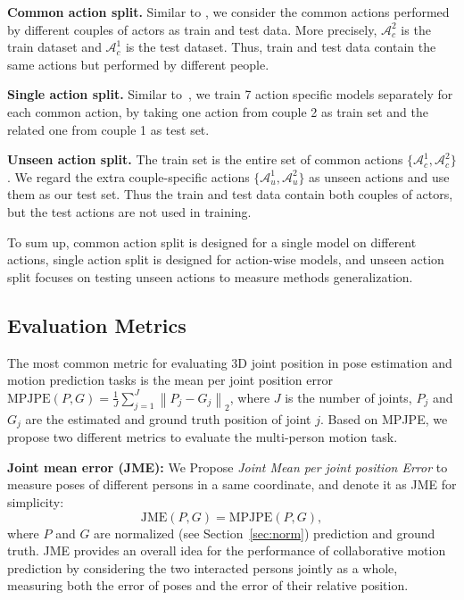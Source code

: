\vspace{0mm}
\noindent\textbf{Common action split.}
Similar to \cite{ionescu2013human3}, we consider the common actions performed by different couples of actors as train and test data. More precisely, $\mathcal{A}_{c}^{2}$ is the train dataset and $\mathcal{A}_{c}^{1}$ is the test dataset. Thus, train and test data contain the same actions but performed by different people. 

\vspace{0mm}
\noindent\textbf{Single action split.}
Similar to~\cite{fragkiadaki2015recurrent,jain2016structural}, we train 7 action specific models separately for each common action, by taking one action from couple 2 as train set and the related one from couple 1 as test set.

\vspace{0mm}
\noindent\textbf{Unseen action split.}
The train set is the entire set of common actions $\{\mathcal{A}_{c}^1, \mathcal{A}_{c}^2\}$. We regard the extra couple-specific actions $\{\mathcal{A}_{u}^{1}, \mathcal{A}_{u}^{2}\}$ as unseen actions and use them as our test set. Thus the train and test data contain both couples of actors, but the test actions are not used in training.

To sum up, common action split is designed for a single model on different actions, single action split is designed for action-wise models, and unseen action split focuses on testing unseen actions to measure methods generalization.



\subsection{Evaluation Metrics}
The most common metric for evaluating 3D joint position in pose estimation and motion prediction tasks is the mean per joint position error $\textrm{MPJPE}(P,G) = \frac{1}{J} \sum_{j=1}^{J} \left\|P_{j} - G_{j}\right\|_2$, where $J$ is the number of joints, $P_{j}$ and $G_{j}$ are the estimated and ground truth position of joint $j$. Based on MPJPE, we propose two different metrics to evaluate the multi-person motion task. 

\vspace{1mm}
\noindent\textbf{Joint mean error (JME):} 
We Propose \textit{Joint Mean per joint position Error} to measure poses of different persons in a same coordinate, and denote it as JME for simplicity:
\begin{equation}
\textrm{JME}(P,G) = \textrm{MPJPE}(P, G),
\label{equ:jmpjpe}
\end{equation}
where $P$ and $G$ are normalized (see  Section~\ref{sec:norm}) prediction and ground truth. JME provides an overall idea for the performance of collaborative motion prediction by considering the two interacted persons jointly as a whole, measuring both the error of poses and the error of their relative position.


